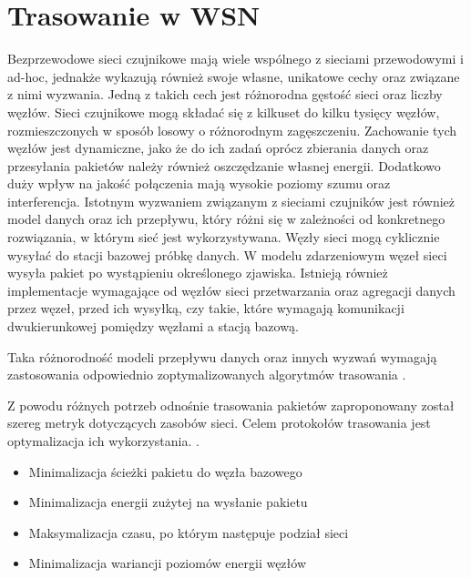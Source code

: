 \section{Trasowanie w WSN} \label{routing}
Bezprzewodowe sieci czujnikowe mają wiele wspólnego z sieciami przewodowymi i ad-hoc, jednakże wykazują również swoje własne, unikatowe cechy oraz związane z nimi wyzwania.
Jedną z takich cech jest różnorodna gęstość sieci oraz liczby węzłów. Sieci czujnikowe mogą składać się z kilkuset do kilku tysięcy węzłów, rozmieszczonych w sposób losowy o różnorodnym zagęszczeniu. Zachowanie tych węzłów jest dynamiczne, jako że do ich zadań oprócz zbierania danych oraz przesyłania pakietów należy również oszczędzanie własnej energii. Dodatkowo duży wpływ na jakość połączenia mają wysokie poziomy szumu oraz interferencja.
Istotnym wyzwaniem związanym z sieciami czujników jest również model danych oraz ich przepływu, który różni się w zależności od konkretnego rozwiązania, w którym sieć jest wykorzystywana. Węzły sieci mogą cyklicznie wysyłać do stacji bazowej próbkę danych. W modelu zdarzeniowym węzeł sieci wysyła pakiet po wystąpieniu określonego zjawiska. Istnieją również implementacje wymagające od węzłów sieci przetwarzania oraz agregacji danych przez węzeł, przed ich wysyłką, czy takie, które wymagają komunikacji dwukierunkowej pomiędzy węzłami a stacją bazową.


Taka różnorodność modeli przepływu danych oraz innych wyzwań wymagają zastosowania odpowiednio zoptymalizowanych algorytmów trasowania \cite{Abdullah2014, Sohraby2006}.

Z powodu różnych potrzeb odnośnie trasowania pakietów zaproponowany został szereg metryk dotyczących zasobów sieci. Celem protokołów trasowania jest optymalizacja ich wykorzystania. \cite{Dargie2010, Biradar2009}.
\begin{itemize}
 \item Minimalizacja ścieżki pakietu do węzła bazowego
 \item Minimalizacja energii zużytej na wysłanie pakietu
 \item Maksymalizacja czasu, po którym następuje podział sieci
 \item Minimalizacja wariancji poziomów energii węzłów
\end{itemize}

